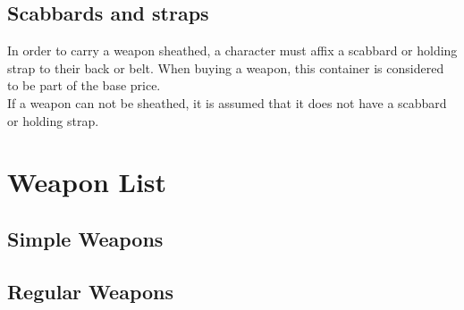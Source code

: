 \subsection{Scabbards and straps}\label{subsec:scabbards}
In order to carry a weapon sheathed, a character must affix a scabbard or holding strap to their back or belt.
When buying a weapon, this container is considered to be part of the base price.\\
If a weapon can not be sheathed, it is assumed that it does not have a scabbard or holding strap.

\section{Weapon List}\label{sec:weaponList}
\subsection{Simple Weapons}\label{subsec:simpleWeapons}
































\subsection{Regular Weapons}\label{subsec:regularWeapons}

